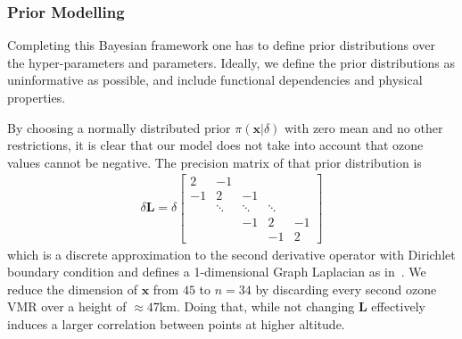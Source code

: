 \documentclass{article}
\begin{document}

\subsubsection{Prior Modelling}
\label{subsec:PriorModelO3}
Completing this Bayesian framework one has to define prior distributions over the hyper-parameters and parameters.
Ideally, we define the prior distributions as uninformative as possible, and include functional dependencies and physical properties.

By choosing a normally distributed prior $\pi(\bm{x}|\delta)$ with zero mean and no other restrictions, it is clear that our model does not take into account that ozone values cannot be negative.
The precision matrix of that prior distribution is
\begin{align}
	\delta \bm{L} =
	\delta
	\begin{bmatrix}
		2 & -1 & & &  \\
		-1 & 2 & -1 & &   \\
		& \ddots & \ddots & \ddots &\\ 
		& & -1 & 2 & -1  \\
		& & & -1 & 2 
	\end{bmatrix} 
	\label{eq:GLapl} 
\end{align}
which is a discrete approximation to the second derivative operator with Dirichlet boundary condition and defines a 1-dimensional Graph Laplacian as in~\cite{wang2015graphs, fox2016fast}.
We reduce the dimension of $\bm{x}$ from $45$ to $n = 34$ by discarding every second ozone VMR over a height of $\approx47$km.
Doing that, while not changing $\bm{L}$ effectively induces a larger correlation between points at higher altitude.
\end{document}
